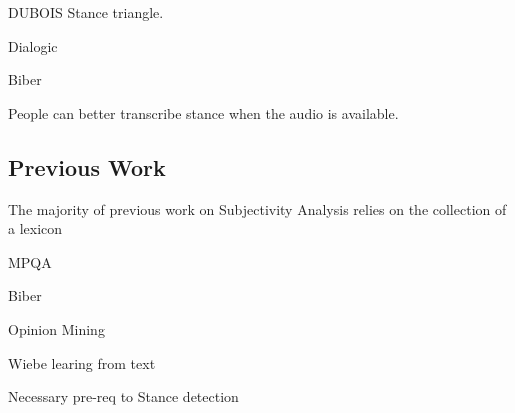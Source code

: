 
DUBOIS Stance triangle.

Dialogic 

Biber 

People can better transcribe stance when the audio is available. 


\subsection{Previous Work}

The majority of previous work on Subjectivity Analysis relies on the collection of a lexicon 

MPQA

Biber 

Opinion Mining 

Wiebe learing from text
 
 Necessary pre-req to Stance detection 